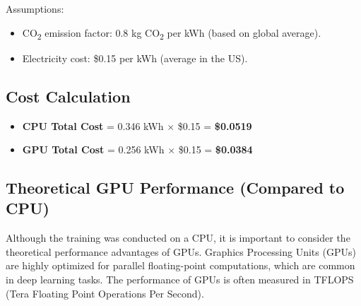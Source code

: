 \newpage

Assumptions:
\begin{itemize}
    \item CO\textsubscript{2} emission factor: 0.8 kg CO\textsubscript{2} per kWh 
    (based on global average).
    \item Electricity cost: \$0.15 per kWh (average in the US).
\end{itemize}


\subsection{Cost Calculation}

\begin{itemize}
    \item \textbf{CPU Total Cost} = 0.346 kWh $\times$ \$0.15 = \textbf{\$0.0519}
    \item \textbf{GPU Total Cost} = 0.256 kWh $\times$ \$0.15 = \textbf{\$0.0384}
\end{itemize}


\subsection{Theoretical GPU Performance (Compared to CPU)}

Although the training was conducted on a CPU, it is important to consider the theoretical 
performance advantages of GPUs. Graphics Processing Units (GPUs) are highly optimized for parallel 
floating-point computations, which are common in deep learning tasks. The performance of GPUs is 
often measured in TFLOPS (Tera Floating Point Operations Per Second).



